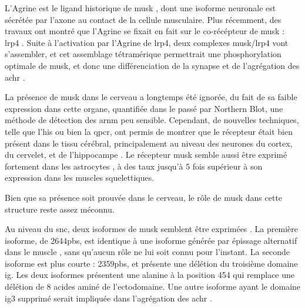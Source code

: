 	L'Agrine est le ligand historique de \gls{musk} \cite{Glass1996}, dont une isoforme neuronale est sécrétée par l'axone au contact de la cellule musculaire. Plus récemment, des travaux ont montré que l'Agrine se fixait en fait sur le co-récépteur de \gls{musk} : \gls{lrp}4 \cite{Zhang2008,Kim2008}. Suite à l'activation par l'Agrine de \acrshort{lrp}4, deux complexes \gls{musk}/\gls{lrp}4 vont s'assembler, et cet assemblage tétramérique permettrait une phosphorylation optimale de \gls{musk}, et donc une différenciation de la synapse et de l'agrégation des \gls{achr} \cite{Zong2012}.
	
	La présence de \gls{musk} dans le cerveau a longtemps été ignorée, du fait de sa faible expression dans cette organe, quantifiée dans le passé par Northern Blot, une méthode de détection des \acrshort{arnm} peu sensible. Cependant, de nouvelles techniques, telle que l'\gls{his} ou bien la \gls{qpcr}, ont permis de montrer que le récepteur était bien présent dans le tissu cérébral, principalement au niveau des neurones du cortex, du cervelet, et de l'hippocampe \cite{Garcia-Osta2006, Ksiazek2007}. Le récepteur \gls{musk} semble aussi être exprimé fortement dans les astrocytes \cite{Sun2016}, à des taux jusqu'à 5 fois supérieur à son expression dans les muscles squelettiques.
	
	Bien que sa présence soit prouvée dans le cerveau, le rôle de \gls{musk} dans cette structure reste assez méconnu. 
	
	
	Au niveau du \gls{snc}, deux isoformes de \gls{musk} semblent être exprimées \cite{Garcia-Osta2006}. La première isoforme, de 2644pbs, est identique à une isoforme générée par épissage alternatif dans le muscle \cite{Valenzuela1995}, sans qu'aucun rôle ne lui soit connu pour l'instant. La seconde isoforme est plus courte : 2359pbs, et présente une délétion du troisième domaine \gls{ig}. Les deux isoformes présentent une alanine à la position 454 qui remplace une délétion de 8 acides aminé de l'ectodomaine. Une autre isoforme ayant le domaine \gls{ig}3 supprimé serait impliquée dans l'agrégation des \gls{achr} \cite{Hesser1999}.
	

